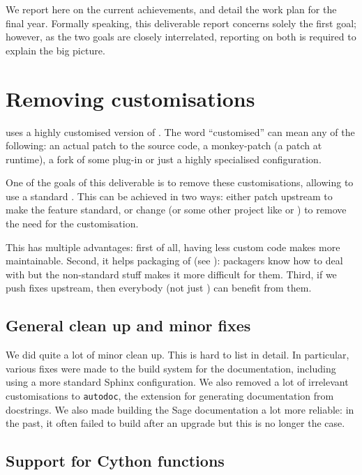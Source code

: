 \documentclass{deliverablereport}
\begin{document}
We report here on the current achievements, and detail the work plan for the
final year. Formally speaking, this deliverable report concerns solely the
first goal; however, as the two goals are closely interrelated, reporting on
both is required to explain the big picture.

\section{Removing \Sage customisations}

\Sage uses a highly customised version of \Sphinx.
The word ``customised'' can mean any of the following:
an actual patch to the source code,
a monkey-patch (a patch at runtime),
a fork of some plug-in or just a highly specialised configuration.

One of the goals of this deliverable is to remove these
customisations, allowing \Sage to use a standard \Sphinx.
This can be achieved in two ways:
either patch upstream \Sphinx to make the feature standard,
or change \Sage (or some other project like \Cython or \Python)
to remove the need for the customisation.

This has multiple advantages:
first of all, having less custom code makes \Sage more maintainable.
Second, it helps packaging of \Sage
(see ):
packagers know how to deal with \Sphinx
but the non-standard \Sage stuff makes it more difficult for them.
Third, if we push fixes upstream, then everybody (not just \Sage)
can benefit from them.

\subsection{General clean up and minor fixes}

We did quite a lot of minor clean up.
This is hard to list in detail.
In particular, various fixes were made to the build system for the documentation,
including using a more standard Sphinx configuration.
We also removed a lot of irrelevant customisations to \texttt{autodoc},
the extension for generating documentation from docstrings.
We also made building the Sage documentation a lot more reliable:
in the past, it often failed to build after an upgrade
but this is no longer the case.

\subsection{Support for Cython functions}\label{cython}
\end{document}
